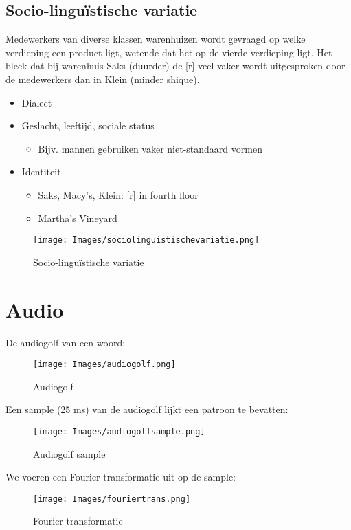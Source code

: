 {\subsection{Socio-linguïstische variatie}
Medewerkers van diverse klassen warenhuizen wordt gevraagd op welke verdieping een product ligt, wetende dat het op de vierde verdieping ligt. Het bleek dat bij warenhuis Saks (duurder) de [r] veel vaker wordt uitgesproken door de medewerkers dan in Klein (minder shique).
\begin{itemize}
    \item Dialect
    \item Geslacht, leeftijd, sociale status
    \begin{itemize}
        \item Bijv. mannen gebruiken vaker niet-standaard vormen
    \end{itemize}
    \item Identiteit
    \begin{itemize}
        \item Saks, Macy's, Klein: [r] in fourth floor
        \item Martha's Vineyard
    \end{itemize}
\end{itemize}
\begin{figure}[h]
    \centering
    \texttt{[image: Images/sociolinguistischevariatie.png]}
    \caption{Socio-linguïstische variatie}
    \label{fig:sociolinguistisch}
\end{figure}
\section{Audio}
\noindent
De audiogolf van een woord:\\
\begin{figure}[h]
    \centering
    \texttt{[image: Images/audiogolf.png]}
    \caption{Audiogolf}
    \label{fig:audiogolf}
\end{figure}
\newpage
\noindent Een sample (25 ms) van de audiogolf lijkt een patroon te bevatten:\\
\begin{figure}[h]
    \centering
    \texttt{[image: Images/audiogolfsample.png]}
    \caption{Audiogolf sample}
    \label{fig:sample}
\end{figure}

\noindent We voeren een Fourier transformatie uit op de sample:\\
\begin{figure}[h]
    \centering
    \texttt{[image: Images/fouriertrans.png]}
    \caption{Fourier transformatie}
    \label{fig:fouriertrans}
\end{figure}

}
